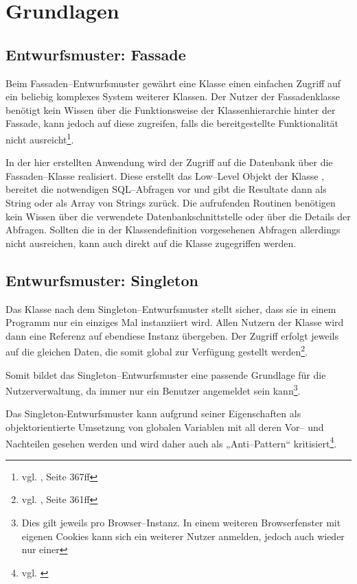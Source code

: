 \section{Grundlagen}
\label{sec:grundlagen}
\subsection{Entwurfsmuster: Fassade}

Beim Fassaden--Entwurfsmuster gewährt eine Klasse einen einfachen Zugriff auf ein beliebig komplexes System weiterer Klassen. Der Nutzer der Fassadenklasse benötigt kein Wissen über die Funktionsweise der Klassenhierarchie hinter der Fassade, kann jedoch auf diese zugreifen, falls die bereitgestellte Funktionalität nicht ausreicht\footnote{vgl. \cite{Balzert}, Seite 367ff}.

In der hier erstellten Anwendung wird der Zugriff auf die Datenbank über die Fassaden--Klasse  realisiert. Diese erstellt das Low--Level Objekt der Klasse , bereitet die notwendigen SQL--Abfragen vor und gibt die Resultate dann als String oder als Array von Strings zurück. Die aufrufenden Routinen benötigen kein Wissen über die verwendete Datenbankschnittstelle oder über die Details der Abfragen. Sollten die in der Klassendefinition vorgesehenen Abfragen allerdings nicht ausreichen, kann auch direkt auf die Klasse  zugegriffen werden.

\subsection{Entwurfsmuster: Singleton}

Das Klasse nach dem Singleton--Entwurfsmuster stellt sicher, dass sie in einem Programm nur ein einziges Mal instanziiert wird. Allen Nutzern der Klasse wird dann eine Referenz auf ebendiese Instanz übergeben. Der Zugriff erfolgt jeweils auf die gleichen Daten, die somit global zur Verfügung gestellt werden\footnote{vgl. \cite{Balzert}, Seite 361ff}.

Somit bildet das Singleton--Entwurfsmuster eine passende Grundlage für die Nutzerverwaltung, da immer nur ein Benutzer angemeldet sein kann\footnote{Dies gilt jeweils pro Browser--Instanz. In einem weiteren Browserfenster mit eigenen Cookies kann sich ein weiterer Nutzer anmelden, jedoch auch wieder nur einer}.

Das Singleton-Entwurfsmuster kann aufgrund seiner Eigenschaften als objektorientierte Umsetzung von globalen Variablen mit all deren Vor-- und Nachteilen gesehen werden und wird daher auch als „Anti--Pattern“ kritisiert\footnote{vgl. \cite{Hauer:singleton}}.

